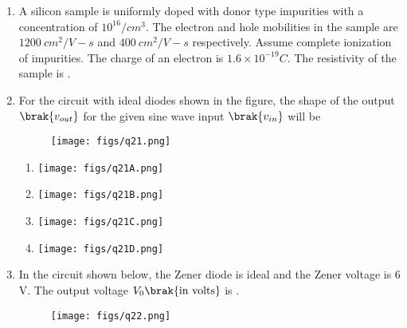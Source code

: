 \documentclass[a4paper, 11pt]{article}
\begin{document}
\begin{enumerate}
    \item A silicon sample is uniformly doped with donor type impurities with a concentration of $10^{16}/cm^{3}$. The electron and hole mobilities in the sample are $1200~cm^{2}/V-s$ and $400~cm^{2}/V-s$ respectively. Assume complete ionization of impurities. The charge of an electron is $1.6\times10^{-19}C$. The resistivity of the sample  is \underline{\hspace{2cm}}.
    
    \hfill{}

    \item For the circuit with ideal diodes shown in the figure, the shape of the output $\brak{v_{out}}$ for the given sine wave input $\brak{v_{in}}$ will be
    \begin{figure}[H]
        \centering
        \texttt{[image: figs/q21.png]}
        \caption*{}
        \label{fig:q21}
    \end{figure}
    \begin{enumerate}
        \item \texttt{[image: figs/q21A.png]}
        \item \texttt{[image: figs/q21B.png]}
        \item \texttt{[image: figs/q21C.png]}
        \item \texttt{[image: figs/q21D.png]}
    \end{enumerate}
    
    \hfill{}

    \item In the circuit shown below, the Zener diode is ideal and the Zener voltage is 6 V. The output voltage $V_{0} \brak{\text{in volts}}$ is \underline{\hspace{2cm}}.
    \begin{figure}[H]
        \centering
        \texttt{[image: figs/q22.png]}
        \caption*{}
        \label{fig:q22}
    \end{figure}
    
    \hfill{}


\end{enumerate}
\end{document}
